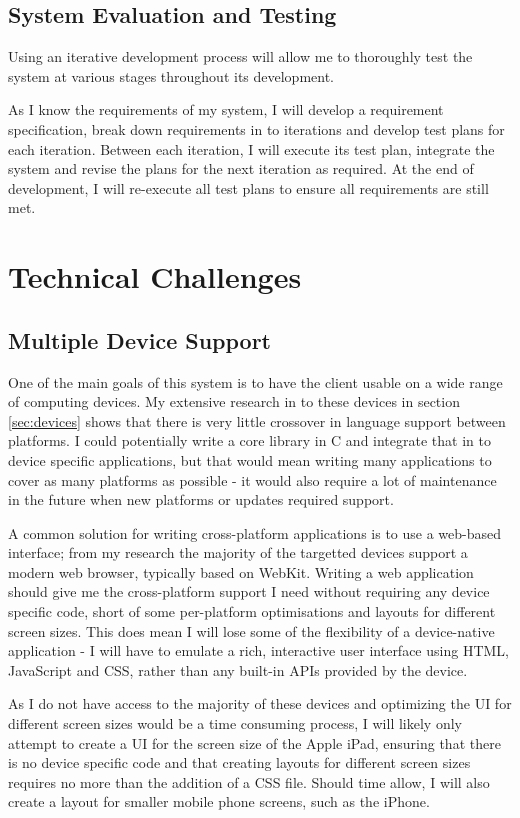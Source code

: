 \documentclass[a4papert,11pt,notitlepage]{ltxdoc}
\begin{document}
\subsection{System Evaluation and Testing}
Using an iterative development process will allow me to thoroughly test the system at various stages throughout its development. 

As I know the requirements of my system, I will develop a requirement specification, break down requirements in to iterations and develop test plans for each iteration. Between each iteration, I will execute its test plan, integrate the system and revise the plans for the next iteration as required. At the end of development, I will re-execute all test plans to ensure all requirements are still met.

\section{Technical Challenges}
\subsection{Multiple Device Support}
One of the main goals of this system is to have the client usable on a wide range of computing devices. My extensive research in to these devices in section \ref{sec:devices} shows that there is very little crossover in language support between platforms. I could potentially write a core library in C and integrate that in to device specific applications, but that would mean writing many applications to cover as many platforms as possible - it would also require a lot of maintenance in the future when new platforms or updates required support.

A common solution for writing cross-platform applications is to use a web-based interface; from my research the majority of the targetted devices support a modern web browser, typically based on WebKit. Writing a web application should give me the cross-platform support I need without requiring any device specific code, short of some per-platform optimisations and layouts for different screen sizes. This does mean I will lose some of the flexibility of a device-native application - I will have to emulate a rich, interactive user interface using HTML, JavaScript and CSS, rather than any built-in APIs provided by the device.

As I do not have access to the majority of these devices and optimizing the UI for different screen sizes would be a time consuming process, I will likely only attempt to create a UI for the screen size of the Apple iPad, ensuring that there is no device specific code and that creating layouts for different screen sizes requires no more than the addition of a CSS file. Should time allow, I will also create a layout for smaller mobile phone screens, such as the iPhone.
\end{document}
